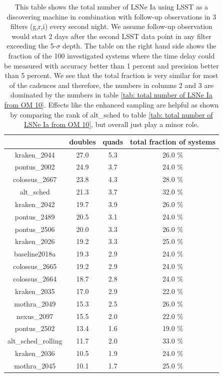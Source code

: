 \begin{table}
\centering
\begin{tabular}{c|c|c|c}
& doubles & quads & total fraction of systems \\
\hline
kraken\_2044 & 27.0 & 5.3 & 26.0 \% \\
\hline
pontus\_2002 & 24.9 & 3.7 & 24.0 \% \\
\hline
colossus\_2667 & 23.8 &4.3 & 28.0 \%  \\
\hline
alt\_sched & 21.3 & 3.7 & 32.0 \% \\
\hline
kraken\_2042 & 19.7 & 3.9 & 26.0 \% \\
\hline
pontus\_2489 & 20.5 & 3.1 & 24.0 \% \\
\hline
pontus\_2506 & 20.0 & 3.3 & 26.0 \% \\
\hline
kraken\_2026 & 19.2 & 3.3 & 25.0 \% \\
\hline
baseline2018a & 19.3 & 2.9 & 24.0 \%  \\
\hline
colossus\_2665 & 19.2 &2.9 & 24.0 \%  \\
\hline
colossus\_2664 & 18.7 &2.8 & 24.0 \%  \\
\hline
kraken\_2035 & 17.0 & 2.9 & 22.0 \% \\
\hline
mothra\_2049 & 15.3& 2.5 & 26.0 \% \\
\hline
nexus\_2097 & 15.5& 2.0 & 22.0 \% \\
\hline
pontus\_2502 & 13.4 & 1.6 & 19.0 \% \\
\hline
alt\_sched\_rolling & 11.7 & 2.0 & 33.0 \% \\
\hline
kraken\_2036 & 10.5 & 1.9 & 24.0 \% \\
\hline
mothra\_2045 & 10.1& 1.7 & 25.0 \% \\

\end{tabular}
\caption{This table shows the total number of LSNe Ia using LSST as a discovering machine in combination with follow-up observations in 3 filters (g,r,i) every second night. We assume follow-up observation would start 2 days after the second LSST data point in any filter exceeding the 5-$\sigma$ depth. The table on the right hand side shows the fraction of the 100 investigated systems where the time delay could be measured with accuracy better than 1 percent and precision better than 5 percent. We see that the total fraction is very similar for most of the cadences and therefore, the numbers in columns 2 and 3 are dominated by the numbers in table \ref{tab: total number of LSNe Ia from OM 10}. Effects like the enhanced sampling are helpful as shown by comparing the rank of alt\_sched to table \ref{tab: total number of LSNe Ia from OM 10}, but overall just play a minor role.}
\label{tab: follow up and number of LSNe Ia}
\end{table}
